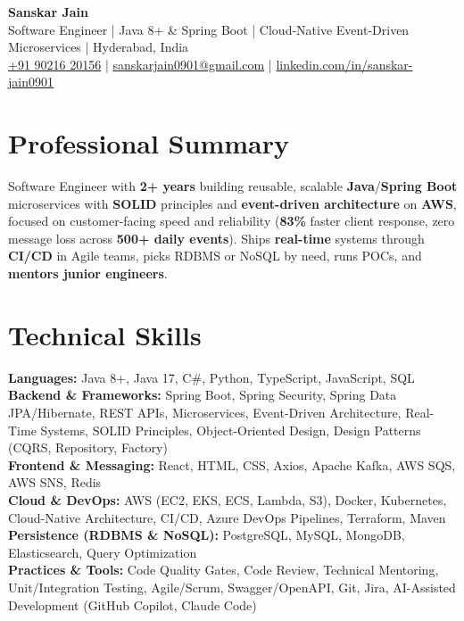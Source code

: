 \documentclass[a4paper,10pt]{article}
\begin{document}
\begin{center}
    {\LARGE \textbf{Sanskar Jain}} \\
    \vspace{2pt}
    Software Engineer \;|\; Java 8+ \& Spring Boot \;|\; Cloud-Native Event-Driven Microservices \;|\; Hyderabad, India \\
    \vspace{2pt}
    \href{tel:+919021620156}{+91 90216 20156} \;|\;
    \href{mailto:sanskarjain0901@gmail.com}{sanskarjain0901@gmail.com} \;|\;
    \href{https://www.linkedin.com/in/sanskar-jain0901/}{linkedin.com/in/sanskar-jain0901}
\end{center}

\section*{Professional Summary}
Software Engineer with \textbf{2+ years} building reusable, scalable \textbf{Java}/\textbf{Spring Boot} microservices with \textbf{SOLID} principles and \textbf{event-driven architecture} on \textbf{AWS}, focused on customer-facing speed and reliability (\textbf{83\%} faster client response, zero message loss across \textbf{500+ daily events}).
Ships \textbf{real-time} systems through \textbf{CI/CD} in Agile teams, picks RDBMS or NoSQL by need, runs POCs, and \textbf{mentors junior engineers}.

\section*{Technical Skills}
\begin{sloppypar}
\noindent
\textbf{Languages:} Java 8+, Java 17, C\#, Python, TypeScript, JavaScript, SQL \\
\textbf{Backend \& Frameworks:} Spring Boot, Spring Security, Spring Data JPA/Hibernate, REST APIs, Microservices, Event-Driven Architecture, Real-Time Systems, SOLID Principles, Object-Oriented Design, Design Patterns (CQRS, Repository, Factory) \\
\textbf{Frontend \& Messaging:} React, HTML, CSS, Axios, Apache Kafka, AWS SQS, AWS SNS, Redis \\
\textbf{Cloud \& DevOps:} AWS (EC2, EKS, ECS, Lambda, S3), Docker, Kubernetes, Cloud-Native Architecture, CI/CD, Azure DevOps Pipelines, Terraform, Maven \\
\textbf{Persistence (RDBMS \& NoSQL):} PostgreSQL, MySQL, MongoDB, Elasticsearch, Query Optimization \\
\textbf{Practices \& Tools:} Code Quality Gates, Code Review, Technical Mentoring, Unit/Integration Testing, Agile/Scrum, Swagger/OpenAPI, Git, Jira, AI-Assisted Development (GitHub Copilot, Claude Code)
\end{sloppypar}
\end{document}
